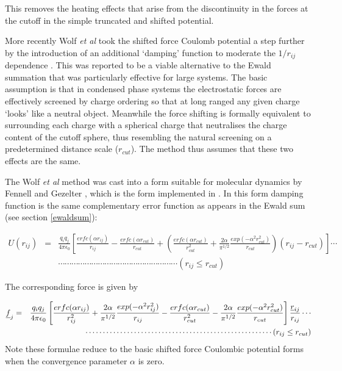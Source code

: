 This removes the heating effects that arise from the discontinuity
in the forces at the cutoff in the simple truncated and shifted
potential. 

More recently Wolf {\em et al} \cite{wolf-99a} took the shifted force
Coulomb potential a step further by the introduction of an additional
`damping' function to moderate the $1/r_{ij}$ dependence
. This was
reported to be a viable alternative to the Ewald summation that was
particularly effective for large systems.  The basic assumption is
that in condensed phase systems the electrostatic forces are
effectively screened by charge ordering so that at long ranged any
given charge `looks' like a neutral object. Meanwhile the force
shifting is formally equivalent to surrounding each charge with a
spherical charge that neutralises the charge content of the cutoff
sphere, thus resembling the natural screening on a predetermined
distance scale ($r_{cut}$). The method thus assumes that these two
effects are the same.

The Wolf {\em et al} method \cite{wolf-99a} was cast into a form
suitable for molecular dynamics by Fennell and Gezelter  \cite{fennell-06a}, which is
the form implemented in \D{}. In this form damping function is the same
complementary error function as appears in the Ewald sum (see section
\ref{ewaldsum}):

\begin{eqnarray}
U(r_{ij})&=&\frac{q_{i}q_{j}}{4\pi\epsilon_{0}}
\left [\frac{erfc(\alpha r_{ij})}{r_{ij}}-\frac{erfc(\alpha 
 r_{cut})}{r_{cut}}+
 \left(\frac{erfc(\alpha
 r_{cut})}{r_{cut}^{2}}+\frac{2\alpha}{\pi^{1/2}}
\frac{exp(-\alpha^{2}r_{cut}^{2})}{r_{cut}}\right )(r_{ij}-r_{cut})
\right ] \cdots \nonumber \\
 & & \cdots \cdots \cdots \cdots \cdots \cdots \cdots \cdots \cdots 
\cdots \cdots \cdots \cdots \cdots \cdots \cdots \cdots \cdots 
(r_{ij}\le r_{cut})
\end{eqnarray}

The corresponding force is given by

\begin{eqnarray}
\mbox{$\underline{f}$}_{j}&=&\frac{q_{i}q_{j}}{4\pi\epsilon_{0}}
\left[\frac{erfc(\alpha r_{ij})}{r_{ij}^{2}}+\frac{2\alpha}{\pi^{1/2}}\frac{exp(-\alpha^{2} r_{ij}^{2})}{r_{ij}}-
 \frac{erfc(\alpha r_{cut})}{r_{cut}^{2}}-\frac{2\alpha}{\pi^{1/2}}
\frac{exp(-\alpha^{2}r_{cut}^{2})}{r_{cut}}\right ]\frac{\mbox{$\underline{r}$}_{ij}}{r_{ij}}
 \cdots \nonumber \\
 & & \cdots \cdots \cdots \cdots \cdots \cdots \cdots \cdots \cdots 
\cdots \cdots \cdots \cdots \cdots \cdots \cdots \cdots \cdots 
(r_{ij}\le r_{cut})
\end{eqnarray}
Note these formulae reduce to the basic shifted force Coulombic
potential forms when the convergence parameter $\alpha$ is zero.

